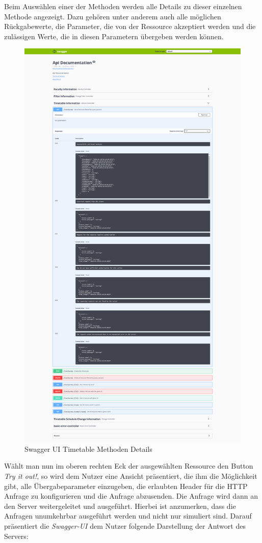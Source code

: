 Beim Auswählen einer der Methoden werden alle Details zu dieser einzelnen Methode angezeigt. Dazu gehören unter anderem auch alle möglichen Rückgabewerte, die Parameter, die von der Ressource akzeptiert werden und die zulässigen Werte, die in diesen Parametern übergeben werden können.

\begin{figure}[H]
\centering
\includegraphics[width=12 cm]{Bilder/Kapitel_6/swagger_ui_method_detail.png}
\caption{Swagger UI Timetable Methoden Details\label{fig:swagger_ui_method_detail}}
\end{figure}

Wählt man nun im oberen rechten Eck der ausgewählten Ressource den Button \textit{Try it out!}, so wird dem Nutzer eine Ansicht präsentiert, die ihm die Möglichkeit gibt, alle Übergabeparameter einzugeben, die erlaubten Header für die \ac{HTTP} Anfrage zu konfigurieren und die Anfrage abzusenden. Die Anfrage wird dann an den Server weitergeleitet und ausgeführt. Hierbei ist anzumerken, dass die Anfragen unumkehrbar ausgeführt werden und nicht nur simuliert sind. Darauf präsentiert die \textit{Swagger-UI} dem Nutzer folgende Darstellung der Antwort des Servers:

